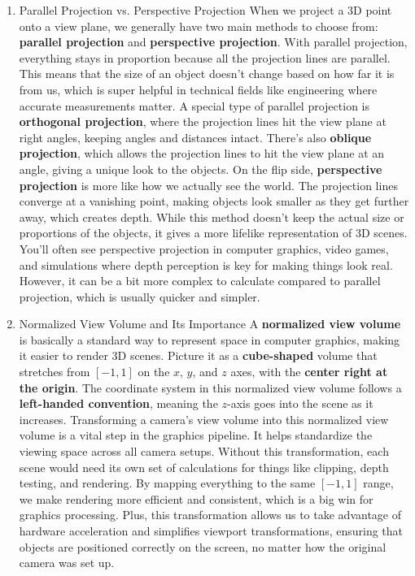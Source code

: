 \documentclass{article}
\begin{document}
 \par
\medskip
{} \par
\medskip
{} \par
\medbreak

\begin{enumerate}
    \item Parallel Projection vs. Perspective Projection
        \medbreak
        When we project a 3D point onto a view plane, we generally have two main methods to choose from: \textbf{parallel projection} and \textbf{perspective projection}. With parallel projection, everything stays in proportion because all the projection lines are parallel. This means that the size of an object doesn’t change based on how far it is from us, which is super helpful in technical fields like engineering where accurate measurements matter. A special type of parallel projection is \textbf{orthogonal projection}, where the projection lines hit the view plane at right angles, keeping angles and distances intact. There’s also \textbf{oblique projection}, which allows the projection lines to hit the view plane at an angle, giving a unique look to the objects.
        \medbreak
        On the flip side, \textbf{perspective projection} is more like how we actually see the world. The projection lines converge at a vanishing point, making objects look smaller as they get further away, which creates depth. While this method doesn’t keep the actual size or proportions of the objects, it gives a more lifelike representation of 3D scenes. You’ll often see perspective projection in computer graphics, video games, and simulations where depth perception is key for making things look real. However, it can be a bit more complex to calculate compared to parallel projection, which is usually quicker and simpler.
    \item Normalized View Volume and Its Importance
        \medbreak
        A \textbf{normalized view volume} is basically a standard way to represent space in computer graphics, making it easier to render 3D scenes. Picture it as a \textbf{cube-shaped} volume that stretches from $[-1,1]$ on the $x$, $y$, and $z$ axes, with the \textbf{center right at the origin}. The coordinate system in this normalized view volume follows a \textbf{left-handed convention}, meaning the $z$-axis goes into the scene as it increases.
        \medbreak
        Transforming a camera’s view volume into this normalized view volume is a vital step in the graphics pipeline. It helps standardize the viewing space across all camera setups. Without this transformation, each scene would need its own set of calculations for things like clipping, depth testing, and rendering. By mapping everything to the same $[-1,1]$ range, we make rendering more efficient and consistent, which is a big win for graphics processing. Plus, this transformation allows us to take advantage of hardware acceleration and simplifies viewport transformations, ensuring that objects are positioned correctly on the screen, no matter how the original camera was set up.

\end{enumerate}
\end{document}
